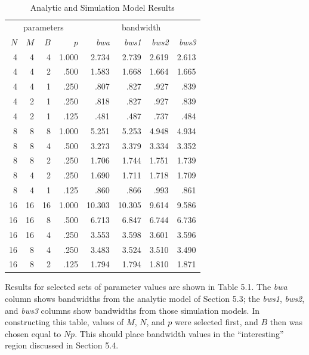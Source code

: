 \begin{table}[H]
\centering
\begin{tabular}{rrrrrrrr}
\multicolumn{4}{c}{parameters} & \multicolumn{4}{c}{bandwidth} \\
$N$ & $M$ & $B$ & $p$ & \emph{bwa} & \emph{bws1} & \emph{bws2} & \emph{bws3} \\
4 & 4 & 4 & 1.000 & 2.734 & 2.739 & 2.619 & 2.613 \\
4 & 4 & 2 & .500 & 1.583 & 1.668 & 1.664 & 1.665 \\
4 & 4 & 1 & .250 & .807 & .827 & .927 & .839 \\
4 & 2 & 1 & .250 & .818 & .827 & .927 & .839 \\
4 & 2 & 1 & .125 & .481 & .487 & .737 & .484 \\
\noalign{\smallskip}
8 & 8 & 8 & 1.000 & 5.251 & 5.253 & 4.948 & 4.934 \\
8 & 8 & 4 & .500 & 3.273 & 3.379 & 3.334 & 3.352 \\
8 & 8 & 2 & .250 & 1.706 & 1.744 & 1.751 & 1.739 \\
8 & 4 & 2 & .250 & 1.690 & 1.711 & 1.718 & 1.709 \\
8 & 4 & 1 & .125 & .860 & .866 & .993 & .861 \\
\noalign{\smallskip}
16 & 16 & 16 & 1.000 & 10.303 & 10.305 & 9.614 & 9.586 \\
16 & 16 & 8 & .500 & 6.713 & 6.847 & 6.744 & 6.736 \\
16 & 16 & 4 & .250 & 3.553 & 3.598 & 3.601 & 3.596 \\
16 & 8 & 4 & .250 & 3.483 & 3.524 & 3.510 & 3.490 \\
16 & 8 & 2 & .125 & 1.794 & 1.794 & 1.810 & 1.871
\end{tabular}
\caption{Analytic and Simulation Model Results}
\end{table}
Results for selected sets of parameter values are shown in Table 5.1. The
\emph{bwa} column shows bandwidths from the analytic model of Section 5.3; the
\emph{bws1}, \emph{bws2}, and \emph{bws3} columns show bandwidths from those simulation
models. In constructing this table, values of $M$, $N$, and $p$ were selected first,
and $B$ then was chosen equal to $Np$. This should place bandwidth values in
the ``interesting'' region discussed in Section 5.4.

